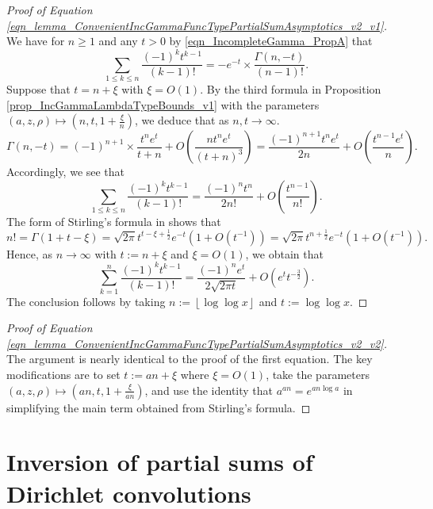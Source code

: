 \documentclass[11pt,reqno,a4letter]{article}
\newcommand{\hlocalref}[1]{\hyperref[#1]{\ref{#1}}}
\numberwithin{equation}{section}
\numberwithin{figure}{section}
\numberwithin{table}{section}
\newcommand{\cf}{cf.~}
\newcommand{\floor}[1]{\left\lfloor #1 \right\rfloor}
\theoremstyle{plain}
\numberwithin{theorem}{section}
\theoremstyle{definition}
\theoremstyle{remark}
\begin{document}
\begin{proof}[Proof of Equation \eqref{eqn_lemma_ConvenientIncGammaFuncTypePartialSumAsymptotics_v2_v1}]
We have for $n \geq 1$ and any $t > 0$ by 
\eqref{eqn_IncompleteGamma_PropA} that 
\[
\sum_{1 \leq k \leq n} \frac{(-1)^k t^{k-1}}{(k-1)!} = -e^{-t} \times 
     \frac{\Gamma(n, -t)}{(n-1)!}. 
\]
Suppose that $t = n + \xi$ with $\xi = O(1)$. 
By the third formula 
in Proposition \hlocalref{prop_IncGammaLambdaTypeBounds_v1} 
with the parameters $(a, z, \rho) \mapsto \left(n, t, 1 + \frac{\xi}{n}\right)$, 
we deduce that as $n,t \rightarrow \infty$. 
\begin{equation*}
\Gamma(n, -t) = (-1)^{n+1} \times \frac{t^n e^{t}}{t+n} + 
     O\left(\frac{n t^n e^{t}}{(t+n)^3}\right) = 
     \frac{(-1)^{n+1} t^n e^t}{2n} + O\left(\frac{t^{n-1} e^t}{n}\right). 
\end{equation*}
Accordingly, we see that 
\[
\sum_{1 \leq k \leq n} \frac{(-1)^k t^{k-1}}{(k-1)!} = 
      \frac{(-1)^{n} t^n}{2n!} + O\left(\frac{t^{n-1}}{n!}\right). 
\]
The form of Stirling's formula in \cite[\cf Eq.\ (5.11.8)]{NISTHB} shows that 
\[
n! = \Gamma(1 + t - \xi) = \sqrt{2\pi} t^{t-\xi+\frac{1}{2}} e^{-t} \left(1 + O\left(t^{-1}\right)\right) = 
     \sqrt{2\pi} t^{n+\frac{1}{2}} e^{-t} \left(1 + O\left(t^{-1}\right)\right). 
\]
Hence, as $n \rightarrow \infty$ with $t := n + \xi$ and $\xi = O(1)$, we obtain that 
\[
\sum_{k=1}^{n} \frac{(-1)^k t^{k-1}}{(k-1)!} = \frac{(-1)^n e^t}{2 \sqrt{2\pi t}} + 
     O\left(e^t t^{-\frac{3}{2}}\right). 
\]
The conclusion follows by taking $n := \floor{\log\log x}$ and $t := \log\log x$. 
\end{proof}
\begin{proof}[Proof of Equation \eqref{eqn_lemma_ConvenientIncGammaFuncTypePartialSumAsymptotics_v2_v2}]
The argument is nearly identical to the proof of the first equation. 
The key modifications are to set $t := an + \xi$ where $\xi = O(1)$, take the parameters 
$\left(a, z, \rho\right) \mapsto \left(an, t, 1 + \frac{\xi}{an}\right)$, and 
use the identity that $a^{an} = e^{an \log a}$ in simplifying the main term obtained 
from Stirling's formula. 
\end{proof}

\section{Inversion of partial sums of Dirichlet convolutions}
\label{Section_PrelimProofs_Config} 
\label{subSection_PrelimProofs_Config_InversionTheorem}
\end{document}
